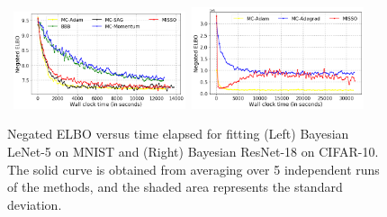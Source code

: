 \documentclass[final,12pt]{alt2022} %
\begin{document}
\begin{figure}[H]
    \begin{center}
    \mbox{\hspace{-0.1in}
        \includegraphics[width=0.45\textwidth]{figure/lenet_vs_wallclock.png}\hspace{-0.1in}
        \includegraphics[width=0.45\textwidth]{figure/resnet_vs_wallclock.png}
    }
    \end{center}\vspace{-0.2in}
\caption{Negated ELBO versus time elapsed for fitting (Left) Bayesian LeNet-5 on MNIST and (Right) Bayesian ResNet-18 on CIFAR-10. The solid curve is obtained from averaging over 5 independent runs of the methods, and the shaded area represents the standard deviation.}\label{fig:lenetopt}
\end{figure}
\vspace{-0.2in}
 
\end{document}
